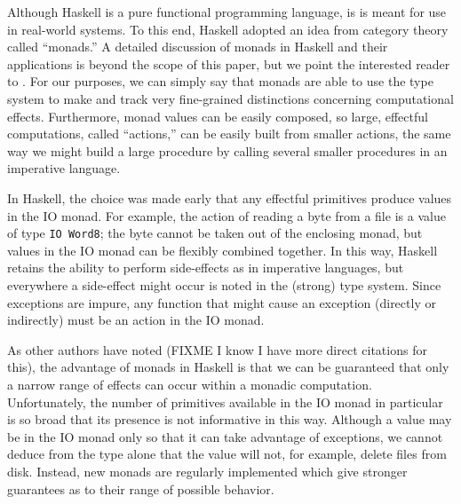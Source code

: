 \documentclass[11pt]{article}
\begin{document}
Although Haskell is a pure functional programming language, is is meant for use in real-world systems.
To this end, Haskell adopted an idea from category theory called ``monads.''
A detailed discussion of monads in Haskell and their applications is beyond the scope of this paper, but we point the interested reader to \cite{awkwardSquad}.
For our purposes, we can simply say that monads are able to use the type system to make and track very fine-grained distinctions concerning computational effects.
Furthermore, monad values can be easily composed, so large, effectful computations, called ``actions,'' can be easily built from smaller actions, the same way we might build a large procedure by calling several smaller procedures in an imperative language.

In Haskell, the choice was made early that any effectful primitives produce values in the IO monad.
For example, the action of reading a byte from a file is a value of type \texttt{IO Word8}; the byte cannot be taken out of the enclosing monad, but values in the IO monad can be flexibly combined together.
In this way, Haskell retains the ability to perform side-effects as in imperative languages, but everywhere a side-effect might occur is noted in the (strong) type system.
Since exceptions are impure, any function that might cause an exception (directly or indirectly) must be an action in the IO monad.

As other authors have noted \cite{ReflectionWithoutRemorse}(FIXME I know I have more direct citations for this), the advantage of monads in Haskell is that we can be guaranteed that only a narrow range of effects can occur within a monadic computation.
Unfortunately, the number of primitives available in the IO monad in particular is so broad that its presence is not informative in this way.
Although a value may be in the IO monad only so that it can take advantage of exceptions, we cannot deduce from the type alone that the value will not, for example, delete files from disk.
Instead, new monads are regularly implemented which give stronger guarantees as to their range of possible behavior.
\end{document}
